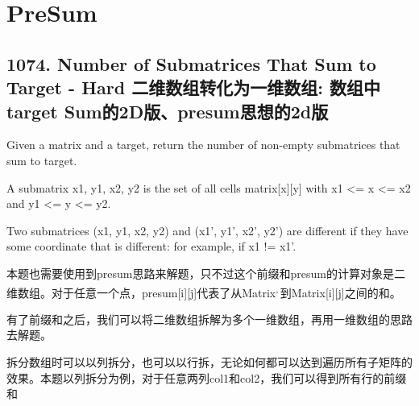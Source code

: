 \documentclass[9pt, b5paaper]{book}
\begin{document}
\chapter{PreSum}
\label{sec-20}
\section{1074. Number of Submatrices That Sum to Target - Hard 二维数组转化为一维数组:  数组中target Sum的2D版、presum思想的2d版}
\label{sec-20-1}
Given a matrix and a target, return the number of non-empty submatrices that sum to target.

A submatrix x1, y1, x2, y2 is the set of all cells matrix[x][y] with x1 <= x <= x2 and y1 <= y <= y2.

Two submatrices (x1, y1, x2, y2) and (x1', y1', x2', y2') are different if they have some coordinate that is different: for example, if x1 != x1'.

本题也需要使用到presum思路来解题，只不过这个前缀和presum的计算对象是二维数组。对于任意一个点，presum[i][j]代表了从Matrix\footnotemark[2]{}\textsuperscript{,}\,\footnotemark[2]{}到Matrix[i][j]之间的和。

有了前缀和之后，我们可以将二维数组拆解为多个一维数组，再用一维数组的思路去解题。

拆分数组时可以以列拆分，也可以以行拆，无论如何都可以达到遍历所有子矩阵的效果。本题以列拆分为例，对于任意两列col1和col2，我们可以得到所有行的前缀和
\end{document}
